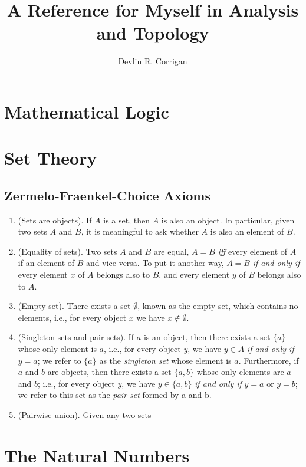 \documentclass{article}
\begin{document}
\title{\huge {A Reference for Myself in Analysis and Topology}}
\author{\Large Devlin R. Corrigan}
\maketitle

\section{Mathematical Logic}

\section{Set Theory}
\subsection{Zermelo-Fraenkel-Choice Axioms}
\begin{enumerate}[label=2.1.\arabic*]
    \item (Sets  are objects). If $A$ is a set, then $A$ is also an object. In particular, given two sets $A$ and $B$, it is meaningful to ask whether $A$ is also an element of $B$.
    \item (Equality of sets). Two sets $A$ and $B$ are equal, $A=B$ \textit{iff} every element of $A$ if an element of $B$ and vice versa. To put it another way, $A=B$ \textit{if and only if} every element $x$ of $A$ belongs also to $B$, and every element $y$ of $B$ belongs also to $A$.
    \item (Empty set). There exists a set $\emptyset$, known as the empty set, which contains no elements, i.e., for every object $x$ we have $x \notin \emptyset$.
    \item (Singleton sets and pair sets). If $a$ is an object, then there exists a set $\{a\}$ whose only element is $a$, i.e., for every object $y$, we have $y \in A$ \textit{if and only if} $y=a$; we refer to $\{a\}$ as the \textit{singleton set} whose element is $a$. Furthermore, if $a$ and $b$ are objects, then there exists a set $\{a,b\}$ whose only elements are $a$ and $b$; i.e., for every object $y$, we have $y\in\{a,b\}$ \textit{if and only if} $y=a$ or $y=b$; we refer to this set as the \textit{pair set} formed by a and b.
    \item (Pairwise union). Given any two sets
\end{enumerate}

\section{The Natural Numbers}
\end{document}
